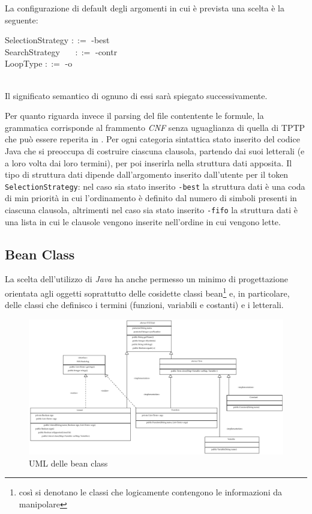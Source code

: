 \documentclass[a4paper,11pt]{article}
\newcommand{\grammarindent}[1][1]{\hspace*{#1\parindent}\ignorespaces}
\begin{document}
La configurazione di default degli argomenti in cui è prevista una scelta è la seguente:\\[1mm]
\begin{ttfamily}
\grammarindent SelectionStrategy $::=$  -best \\
\grammarindent SearchStrategy ~~~$::=$  -contr\\
\grammarindent LoopType $::=$ 	-o \\
\\[1mm]
\end{ttfamily}
Il significato semantico di ognuno di essi sarà spiegato successivamente.\par 
Per quanto riguarda invece il parsing del file contentente le formule, la grammatica corrisponde al frammento \emph{CNF} senza uguaglianza di quella di TPTP che può essere reperita in \cite{TPTPsyntax}. Per ogni categoria sintattica stato inserito del codice Java che si preoccupa di costruire ciascuna clausola, partendo dai suoi letterali (e a loro volta dai loro termini), per poi inserirla nella struttura dati apposita. Il tipo di struttura dati dipende dall'argomento inserito dall'utente per il token \texttt{SelectionStrategy}: nel caso sia stato inserito \texttt{-best} la struttura dati è una coda di min priorità in cui l'ordinamento è definito dal numero di simboli presenti in ciascuna clausola, altrimenti nel caso sia stato inserito \texttt{-fifo} la struttura dati è una lista in cui le clausole vengono inserite nell'ordine in cui vengono lette.

\subsection{Bean Class}
La scelta dell'utilizzo di \emph{Java} ha anche permesso un minimo di progettazione orientata agli oggetti soprattutto delle cosidette classi bean\footnote{così si denotano le classi che logicamente contengono le informazioni da manipolare} e, in particolare, delle classi che definisco i termini (funzioni, variabili e costanti) e i letterali. 

\begin{figure}[h]
\includegraphics[width=1\columnwidth]{beanClassUML}
\caption{\small{UML delle bean class}}
\label{beanClassUML}
\end{figure}
\end{document}
